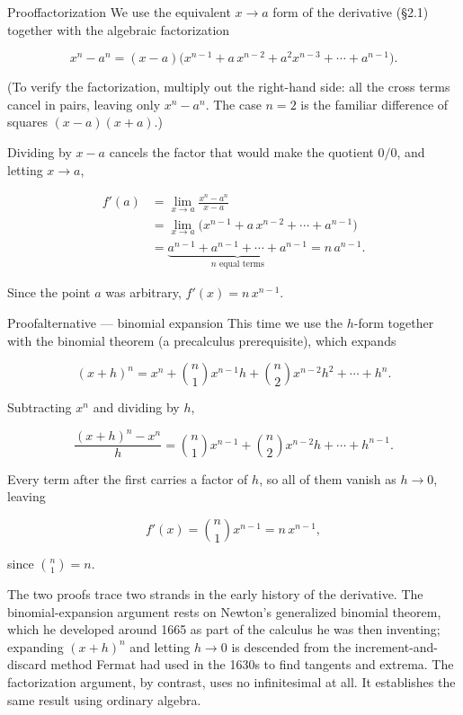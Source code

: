\documentclass[a4paper,12pt,oneside]{memoir}
\begin{document}
\begin{envproof}{Proof}{}{factorization}
We use the equivalent \(x \to a\) form of the derivative (§2.1) together with the algebraic factorization

\[ x^{n} - a^{n} = (x - a)\bigl(x^{n-1} + a\,x^{n-2} + a^{2}x^{n-3} + \cdots + a^{n-1}\bigr). \]

(To verify the factorization, multiply out the right-hand side: all the cross terms cancel in pairs, leaving only \(x^{n} - a^{n}\). The case \(n = 2\) is the familiar difference of squares \((x - a)(x + a)\).)

Dividing by \(x - a\) cancels the factor that would make the quotient \(0/0\), and letting \(x \to a\),

\[ \begin{aligned}
        f'(a) &= \lim_{x \to a} \frac{x^{n} - a^{n}}{x - a} \\[2pt]
              &= \lim_{x \to a} \bigl(x^{n-1} + a\,x^{n-2} + \cdots + a^{n-1}\bigr) \\[2pt]
              &= \underbrace{a^{n-1} + a^{n-1} + \cdots + a^{n-1}}_{n \text{ equal terms}} = n\,a^{n-1}.
      \end{aligned} \]

Since the point \(a\) was arbitrary, \(f'(x) = n\,x^{n-1}\).
\end{envproof}
\begin{envproof}{Proof}{}{alternative — binomial expansion}
This time we use the \(h\)-form together with the binomial theorem (a precalculus prerequisite), which expands

\[ (x + h)^{n} = x^{n} + \binom{n}{1} x^{n-1} h + \binom{n}{2} x^{n-2} h^{2} + \cdots + h^{n}. \]

Subtracting \(x^{n}\) and dividing by \(h\),

\[ \frac{(x + h)^{n} - x^{n}}{h} = \binom{n}{1} x^{n-1} + \binom{n}{2} x^{n-2} h + \cdots + h^{n-1}. \]

Every term after the first carries a factor of \(h\), so all of them vanish as \(h \to 0\), leaving

\[ f'(x) = \binom{n}{1} x^{n-1} = n\,x^{n-1}, \]

since \(\binom{n}{1} = n\).
\end{envproof}
The two proofs trace two strands in the early history of the derivative. The binomial-expansion argument rests on Newton’s generalized binomial theorem, which he developed around 1665 as part of the calculus he was then inventing; expanding \((x + h)^{n}\) and letting \(h \to 0\) is descended from the increment-and-discard method Fermat had used in the 1630s to find tangents and extrema. The factorization argument, by contrast, uses no infinitesimal at all. It establishes the same result using ordinary algebra.
\end{document}
